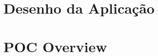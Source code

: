\begin{apendicesenv}
\chapter{Desenho da Aplicação}
%

\chapter{POC Overview}
%



\end{apendicesenv}
